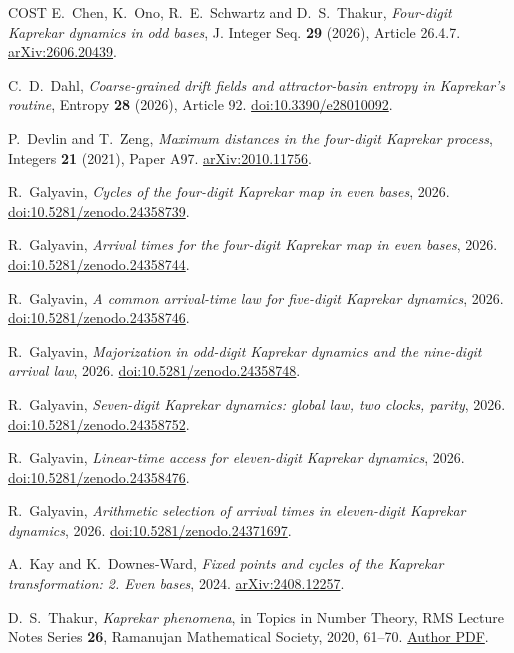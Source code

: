 \documentclass[11pt,reqno]{amsart}
\theoremstyle{definition}
\begin{document}
\begingroup
\raggedright
\begin{thebibliography}{COST}
E.~Chen, K.~Ono, R.~E.~Schwartz and D.~S.~Thakur,
\emph{Four-digit Kaprekar dynamics in odd bases},
J. Integer Seq. \textbf{29} (2026), Article 26.4.7.
\href{https://arxiv.org/abs/2606.20439}{arXiv:2606.20439}.

C.~D.~Dahl, \emph{Coarse-grained drift fields and attractor-basin entropy
in Kaprekar's routine}, Entropy \textbf{28} (2026), Article 92.
\href{https://doi.org/10.3390/e28010092}{doi:10.3390/e28010092}.

P.~Devlin and T.~Zeng, \emph{Maximum distances in the four-digit
Kaprekar process}, Integers \textbf{21} (2021), Paper A97.
\href{https://arxiv.org/abs/2010.11756}{arXiv:2010.11756}.

R.~Galyavin, \emph{Cycles of the four-digit Kaprekar map in even bases}, 2026.
\href{https://doi.org/10.5281/zenodo.24358739}{doi:10.5281/zenodo.24358739}.

R.~Galyavin, \emph{Arrival times for the four-digit Kaprekar map in even bases}, 2026.
\href{https://doi.org/10.5281/zenodo.24358744}{doi:10.5281/zenodo.24358744}.

R.~Galyavin, \emph{A common arrival-time law for five-digit Kaprekar dynamics}, 2026.
\href{https://doi.org/10.5281/zenodo.24358746}{doi:10.5281/zenodo.24358746}.

R.~Galyavin, \emph{Majorization in odd-digit Kaprekar dynamics and the nine-digit arrival law}, 2026.
\href{https://doi.org/10.5281/zenodo.24358748}{doi:10.5281/zenodo.24358748}.

R.~Galyavin, \emph{Seven-digit Kaprekar dynamics: global law, two clocks, parity}, 2026.
\href{https://doi.org/10.5281/zenodo.24358752}{doi:10.5281/zenodo.24358752}.

R.~Galyavin, \emph{Linear-time access for eleven-digit Kaprekar dynamics}, 2026.
\href{https://doi.org/10.5281/zenodo.24358476}{doi:10.5281/zenodo.24358476}.

R.~Galyavin, \emph{Arithmetic selection of arrival times in eleven-digit Kaprekar dynamics}, 2026.
\href{https://doi.org/10.5281/zenodo.24371697}{doi:10.5281/zenodo.24371697}.

A.~Kay and K.~Downes-Ward, \emph{Fixed points and cycles of the Kaprekar
transformation: 2. Even bases}, 2024.
\href{https://arxiv.org/abs/2408.12257}{arXiv:2408.12257}.

D.~S.~Thakur, \emph{Kaprekar phenomena}, in Topics in Number Theory,
RMS Lecture Notes Series \textbf{26}, Ramanujan Mathematical Society, 2020,
61--70. \href{https://www.sas.rochester.edu/mth/sites/dinesh-thakur/kaprekar.pdf}{Author PDF}.
\end{thebibliography}
\endgroup
\end{document}
